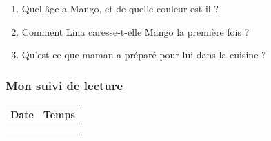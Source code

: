 \documentclass[
  french,
  french,
  14pt,
  a4paper]{extarticle}
\providecommand{\tightlist}{%
  \setlength{\itemsep}{0pt}\setlength{\parskip}{0pt}}
\begin{document}
{\begin{enumerate}
\def\labelenumi{\arabic{enumi}.}
\tightlist
\item
  Quel âge a Mango, et de quelle couleur est-il ?
\item
  Comment Lina caresse-t-elle Mango la première fois ?
\item
  Qu'est-ce que maman a préparé pour lui dans la cuisine ?
\end{enumerate}

\subsubsection{Mon suivi de lecture}\label{mon-suivi-de-lecture-4}

\begin{center}
\begin{tabularx}{\textwidth}{|X|X|}
\hline
\textbf{Date} & \textbf{Temps} \\
\hline
& \\
\hline
& \\
\hline
& \\
\hline
\end{tabularx}
\end{center}

}%
\newpage
\end{document}
